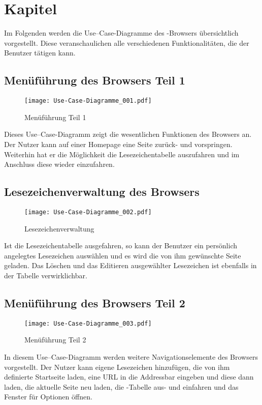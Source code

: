 
\chapter{Kapitel}

Im Folgenden werden die Use--Case-Diagramme des \SECH-Browsers übersichtlich vorgestellt. Diese veranschaulichen alle verschiedenen Funktionalitäten, die der Benutzer tätigen kann.

\section{Menüführung des Browsers Teil 1}

\begin{figure}[htb]
\texttt{[image: Use-Case-Diagramme\_001.pdf]}
	\caption{Menüführung Teil 1}
	\label{fig:Menüführung Teil 1}
\end{figure}
	
Dieses Use--Case-Diagramm zeigt die wesentlichen Funktionen des Browsers an. Der Nutzer kann auf einer Homepage eine Seite zurück- und vorspringen. Weiterhin hat er die Möglichkeit die Lesezeichentabelle auszufahren und im Anschluss diese wieder einzufahren.

\section{Lesezeichenverwaltung des Browsers}

\begin{figure}[htb]
\texttt{[image: Use-Case-Diagramme\_002.pdf]}
	\caption{Lesezeichenverwaltung}
	\label{fig:Lesezeichenverwaltung}
\end{figure}

Ist die Lesezeichentabelle ausgefahren, so kann der Benutzer ein persönlich angelegtes Lesezeichen auswählen und es wird die von ihm gewünschte Seite geladen. Das Löschen und das Editieren ausgewählter Lesezeichen ist ebenfalls in der Tabelle verwirklichbar.

\section{Menüführung des Browsers Teil 2}

\begin{figure}[htb]
\texttt{[image: Use-Case-Diagramme\_003.pdf]}
	\caption{Menüführung Teil 2}
	\label{fig:Menüführung Teil 2}
\end{figure}
In diesem Use--Case-Diagramm werden weitere Navigationselemente des Browsers vorgestellt. Der Nutzer kann eigene Lesezeichen hinzufügen, die von ihm definierte Startseite laden, eine URL in die Addressbar eingeben und diese dann laden, die aktuelle Seite neu laden, die \SEARCH-Tabelle aus- und einfahren und das Fenster für Optionen öffnen.

